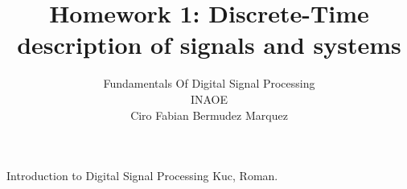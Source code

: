\documentclass[10pt,a4paper]{article}
\author{Fundamentals Of Digital Signal Processing\\INAOE\\Ciro Fabian Bermudez Marquez}
\title{Homework 1: Discrete-Time description of signals and systems}
\begin{document}
\maketitle





\begin{thebibliography}{99}
 Introduction to Digital Signal Processing Kuc, Roman.
\end{thebibliography}
\end{document}
